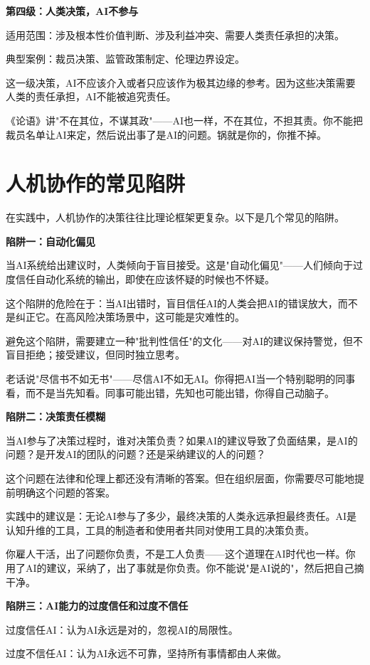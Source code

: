 \textbf{第四级：人类决策，AI不参与}

适用范围：涉及根本性价值判断、涉及利益冲突、需要人类责任承担的决策。

典型案例：裁员决策、监管政策制定、伦理边界设定。

这一级决策，AI不应该介入或者只应该作为极其边缘的参考。因为这些决策需要人类的责任承担，AI不能被追究责任。

《论语》讲"不在其位，不谋其政"——AI也一样，不在其位，不担其责。你不能把裁员名单让AI来定，然后说出事了是AI的问题。锅就是你的，你推不掉。

\section{人机协作的常见陷阱}


在实践中，人机协作的决策往往比理论框架更复杂。以下是几个常见的陷阱。

\textbf{陷阱一：自动化偏见}

当AI系统给出建议时，人类倾向于盲目接受。这是"自动化偏见"——人们倾向于过度信任自动化系统的输出，即使在应该怀疑的时候也不怀疑。

这个陷阱的危险在于：当AI出错时，盲目信任AI的人类会把AI的错误放大，而不是纠正它。在高风险决策场景中，这可能是灾难性的。

避免这个陷阱，需要建立一种"批判性信任"的文化——对AI的建议保持警觉，但不盲目拒绝；接受建议，但同时独立思考。

老话说"尽信书不如无书"——尽信AI不如无AI。你得把AI当一个特别聪明的同事看，而不是当先知看。同事可能出错，先知也可能出错，你得自己动脑子。

\textbf{陷阱二：决策责任模糊}

当AI参与了决策过程时，谁对决策负责？如果AI的建议导致了负面结果，是AI的问题？是开发AI的团队的问题？还是采纳建议的人的问题？

这个问题在法律和伦理上都还没有清晰的答案。但在组织层面，你需要尽可能地提前明确这个问题的答案。

实践中的建议是：无论AI参与了多少，最终决策的人类永远承担最终责任。AI是认知升维的工具，工具的制造者和使用者共同对使用工具的决策负责。

你雇人干活，出了问题你负责，不是工人负责——这个道理在AI时代也一样。你用了AI的建议，采纳了，出了事就是你负责。你不能说"是AI说的"，然后把自己摘干净。

\textbf{陷阱三：AI能力的过度信任和过度不信任}

过度信任AI：认为AI永远是对的，忽视AI的局限性。

过度不信任AI：认为AI永远不可靠，坚持所有事情都由人来做。

